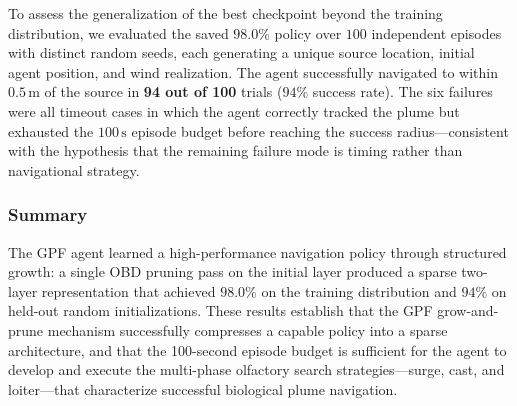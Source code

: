To assess the generalization of the best checkpoint beyond the training
distribution, we evaluated the saved $98.0\%$ policy over $100$
independent episodes with distinct random seeds, each generating a unique
source location, initial agent position, and wind realization.  The agent
successfully navigated to within $0.5\,\text{m}$ of the source in
\textbf{94 out of 100} trials ($94\%$ success rate).  The six failures
were all timeout cases in which the agent correctly tracked the plume but
exhausted the $100\,\text{s}$ episode budget before reaching the success
radius—consistent with the hypothesis that the remaining failure mode is
timing rather than navigational strategy.

\subsubsection{Summary}

The GPF agent learned a high-performance navigation policy through
structured growth: a single OBD pruning pass on the initial layer produced
a sparse two-layer representation that achieved $98.0\%$ on the training
distribution and $94\%$ on held-out random initializations.  These results
establish that the GPF grow-and-prune mechanism successfully compresses a
capable policy into a sparse architecture, and that the 100-second episode
budget is sufficient for the agent to develop and execute the multi-phase
olfactory search strategies—surge, cast, and loiter—that characterize
successful biological plume navigation.
